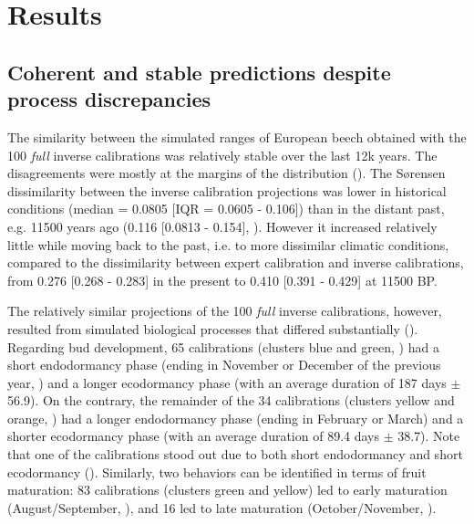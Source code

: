 \documentclass[preprint,12pt,authoryear]{elsarticle}
\begin{document}
\section{Results}

\subsection{Coherent and stable predictions despite process discrepancies}

The similarity between the simulated ranges of European beech obtained with the 100 \emph{full} inverse calibrations was relatively stable over the last 12k years. The disagreements were mostly at the margins of the distribution (). The S\o rensen dissimilarity between the inverse calibration projections was lower in historical conditions (median = 0.0805 [IQR = 0.0605 - 0.106]) than in the distant past, e.g. 11500 years ago (0.116 [0.0813 - 0.154], ). However it increased relatively little while moving back to the past, i.e. to more dissimilar climatic conditions, compared to the dissimilarity between expert calibration and inverse calibrations, from 0.276 [0.268 - 0.283] in the present to 0.410 [0.391 - 0.429] at 11500 BP.

The relatively similar projections of the 100 \emph{full} inverse calibrations, however, resulted from simulated biological processes that differed substantially (). Regarding bud development, 65 calibrations (clusters blue and green, )  had a short endodormancy phase (ending in November or December of the previous year, ) and a longer ecodormancy phase (with an average duration of 187 days $\pm$ 56.9). On the contrary, the remainder of the 34 calibrations (clusters yellow and orange, ) had a longer endodormancy phase (ending in February or March) and a shorter ecodormancy phase (with an average duration of 89.4 days $\pm$ 38.7). Note that one of the calibrations stood out due to both short endodormancy and short ecodormancy (). Similarly, two behaviors can be identified in terms of fruit maturation: 83 calibrations (clusters green and yellow) led to early maturation (August/September, ), and 16 led to late maturation (October/November, ).
\end{document}

